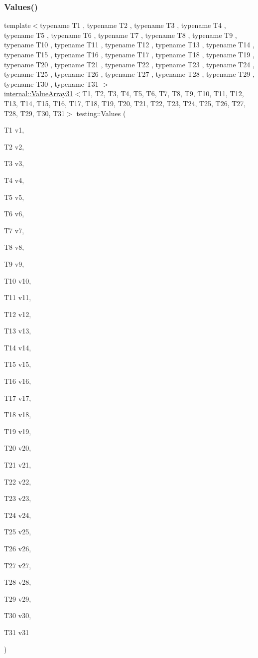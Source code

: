 \mbox{\label{namespacetesting_a40d9696e1754455c8329a866c17ed7bb}} 
\subsubsection{\texorpdfstring{Values()}{Values()}\hspace{0.1cm}{\footnotesize\ttfamily [31/50]}}
{\footnotesize\ttfamily template$<$typename T1 , typename T2 , typename T3 , typename T4 , typename T5 , typename T6 , typename T7 , typename T8 , typename T9 , typename T10 , typename T11 , typename T12 , typename T13 , typename T14 , typename T15 , typename T16 , typename T17 , typename T18 , typename T19 , typename T20 , typename T21 , typename T22 , typename T23 , typename T24 , typename T25 , typename T26 , typename T27 , typename T28 , typename T29 , typename T30 , typename T31 $>$ \\
\mbox{\hyperlink{classtesting_1_1internal_1_1ValueArray31}{internal\+::\+Value\+Array31}}$<$T1, T2, T3, T4, T5, T6, T7, T8, T9, T10, T11, T12, T13, T14, T15, T16, T17, T18, T19, T20, T21, T22, T23, T24, T25, T26, T27, T28, T29, T30, T31$>$ testing\+::\+Values (\begin{DoxyParamCaption}\item[{T1}]{v1,  }\item[{T2}]{v2,  }\item[{T3}]{v3,  }\item[{T4}]{v4,  }\item[{T5}]{v5,  }\item[{T6}]{v6,  }\item[{T7}]{v7,  }\item[{T8}]{v8,  }\item[{T9}]{v9,  }\item[{T10}]{v10,  }\item[{T11}]{v11,  }\item[{T12}]{v12,  }\item[{T13}]{v13,  }\item[{T14}]{v14,  }\item[{T15}]{v15,  }\item[{T16}]{v16,  }\item[{T17}]{v17,  }\item[{T18}]{v18,  }\item[{T19}]{v19,  }\item[{T20}]{v20,  }\item[{T21}]{v21,  }\item[{T22}]{v22,  }\item[{T23}]{v23,  }\item[{T24}]{v24,  }\item[{T25}]{v25,  }\item[{T26}]{v26,  }\item[{T27}]{v27,  }\item[{T28}]{v28,  }\item[{T29}]{v29,  }\item[{T30}]{v30,  }\item[{T31}]{v31 }\end{DoxyParamCaption})}

